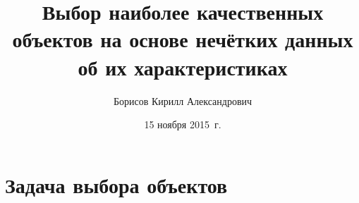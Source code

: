 



\title[Выбор объектов по экспертным оценкам]{Выбор наиболее качественных объектов на основе нечётких данных об их характеристиках}
\author{Борисов Кирилл Александрович}

\date{15 ноября 2015~г.}


\sloppy

\maketitle

\section{Задача выбора объектов}


